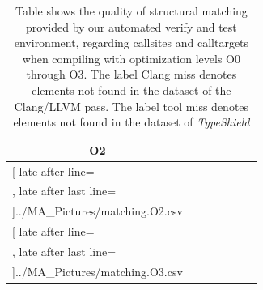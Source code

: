 \begin{table}
{\begin{tabular}{l|c|c|c|c|c|c}
	\multicolumn{1}{c}{\bfseries O2}%
	\\\midrule
	\csvreader[ late after line=\\, late after last line=\\\midrule]{../MA_Pictures/matching.O2.csv}{
	}
	{\csvcoli & \csvcoliii & \csvcoliv & \csvcolv & \csvcolix & \csvcolx & \csvcolxi }%
%
%

	\multicolumn{1}{c}{\bfseries O3 }%
	\\\midrule
	\csvreader[ late after line=\\, late after last line=\\\bottomrule]{../MA_Pictures/matching.O3.csv}{
	}
	{\csvcoli & \csvcoliii & \csvcoliv & \csvcolv & \csvcolix & \csvcolx & \csvcolxi }%
    	\end{tabular}
}
		\caption {Table shows the quality of structural matching provided by our automated verify and test environment, regarding callsites and calltargets when compiling with optimization levels O0 through O3. The label Clang miss denotes elements not found in the dataset of the Clang/LLVM pass. The label tool miss denotes elements not found in the dataset of \textit{TypeShield}}
	\label{tbl:matchingquality}
\end{table}



